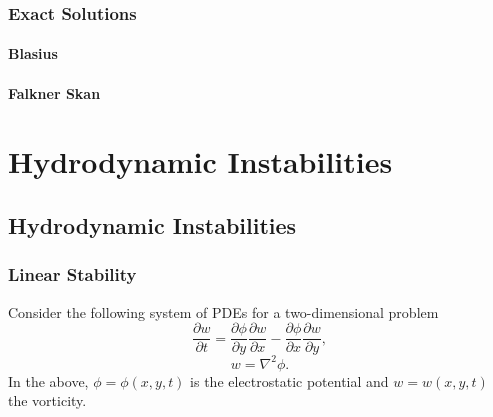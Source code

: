 \documentclass[oneside,a4paper,11pt]{report}
\begin{document}
\section{Exact Solutions}

\subsection{Blasius}

\subsection{Falkner Skan}

\part{Hydrodynamic Instabilities}

\chapter{Hydrodynamic Instabilities}

\section{Linear Stability}
Consider the following system of PDEs for a two-dimensional problem
\begin{equation}
    \frac{\partial w}{\partial t} = \frac{\partial \phi}{\partial y}\frac{\partial w}{\partial x} - \frac{\partial \phi}{\partial x} \frac{\partial w}{\partial y},
\end{equation}
\begin{equation}
    w = \nabla^2 \phi .
\end{equation}
In the above, $\phi = \phi(x,y,t)$ is the electrostatic potential and $w = w(x,y,t)$ the vorticity.
\end{document}
